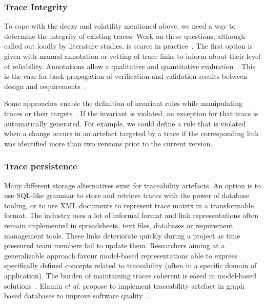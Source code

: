 
\subsubsection{Trace Integrity} 
To cope with the decay and volatility mentioned above, we need a way to determine the integrity of existing traces. Work on these questions, although called out loudly by literature studies, is scarce in practice~\cite{winkler2010-survey-traceability-and-MDE,antoniol2017-traceability-grand-challenges}. The first option is given with manual annotation or vetting of trace links to inform about their level of reliability. Annotations allow a qualitative and quantitative evaluation~\cite{Buchmann_2015}. This is the case for back-propagation of verification and validation results between design and requirements~\cite{Hegedus_2010}.  

Some approaches enable the definition of invariant rules while manipulating traces or their targets~\cite{Bunder_2017_query-for-quality}. If the invariant is violated, an exception for that trace is automatically generated. For example, we could define a rule that is violated when a change occurs in an artefact targeted by a trace if the corresponding link was identified more than two versions prior to the current version. 

\subsubsection{Trace persistence} 

Many different storage alternatives exist for traceability artefacts.
An option is to use SQL-like grammar to store and retrieve traces with the power of database tooling, or to use XML documents to represent trace matrix in a transformable format. The industry uses a lot of informal format and link representations often remain implemented in spreadsheets, text files, databases or requirement management tools. These links deteriorate quickly during a project as time pressured team members fail to update them. 
Researchers aiming at a generalizable approach favour model-based representations able to express specifically defined concepts related to traceability (often in a specific domain of application). The burden of maintaining traces coherent is eased in model-based solutions~\cite{clelandhuang2007bestPracticeForAutomatedTraceability}. Elamin \textit{et al.} propose to implement traceability artefact in graph based databases to improve software quality~\cite{elamin2018-repositories-as-graph-databases}.

